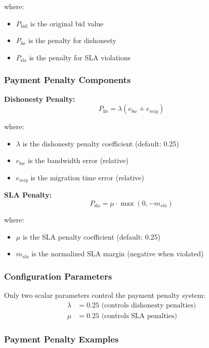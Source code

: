 \documentclass[12pt,a4paper]{article}
\begin{document}
where:
\begin{itemize}
    \item $P_{\text{bid}}$ is the original bid value
    \item $P_{\text{lie}}$ is the penalty for dishonesty
    \item $P_{\text{sla}}$ is the penalty for SLA violations
\end{itemize}

\subsubsection{Payment Penalty Components}

\textbf{Dishonesty Penalty:}
\begin{equation}
    P_{\text{lie}} = \lambda (e_{bw} + e_{mig})
\end{equation}

where:
\begin{itemize}
    \item $\lambda$ is the dishonesty penalty coefficient (default: 0.25)
    \item $e_{bw}$ is the bandwidth error (relative)
    \item $e_{mig}$ is the migration time error (relative)
\end{itemize}

\textbf{SLA Penalty:}
\begin{equation}
    P_{\text{sla}} = \mu \cdot \max(0, -m_{sla})
\end{equation}

where:
\begin{itemize}
    \item $\mu$ is the SLA penalty coefficient (default: 0.25)
    \item $m_{sla}$ is the normalized SLA margin (negative when violated)
\end{itemize}

\subsubsection{Configuration Parameters}

Only two scalar parameters control the payment penalty system:
\begin{align}
    \lambda &= 0.25 \text{ (controls dishonesty penalties)} \\
    \mu &= 0.25 \text{ (controls SLA penalties)}
\end{align}

\subsubsection{Payment Penalty Examples}
\end{document}
